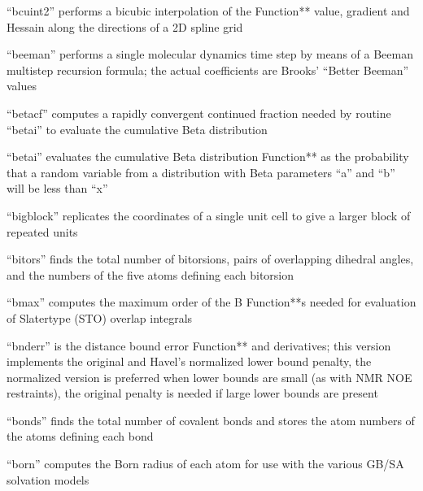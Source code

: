 \documentclass[letterpaper,11pt,english]{sphinxmanual}
\begin{document}
“bcuint2” performs a bicubic interpolation of the Function** value, gradient and Hessain along the directions of a 2D spline grid


“beeman” performs a single molecular dynamics time step by means of a Beeman multistep recursion formula; the actual coefficients are Brooks’ “Better Beeman” values


“betacf” computes a rapidly convergent continued fraction needed by routine “betai” to evaluate the cumulative Beta distribution


“betai” evaluates the cumulative Beta distribution Function** as the probability that a random variable from a distribution with Beta parameters “a” and “b” will be less than “x”


“bigblock” replicates the coordinates of a single unit cell to give a larger block of repeated units


“bitors” finds the total number of bitorsions, pairs of overlapping dihedral angles, and the numbers of the five atoms defining each bitorsion


“bmax” computes the maximum order of the B Function**s needed for evaluation of Slater\sphinxhyphen{}type (STO) overlap integrals


“bnderr” is the distance bound error Function** and derivatives; this version implements the original and Havel’s normalized lower bound penalty, the normalized version is preferred when lower bounds are small (as with NMR NOE restraints), the original penalty is needed if large lower bounds are present


“bonds” finds the total number of covalent bonds and stores the atom numbers of the atoms defining each bond


“born” computes the Born radius of each atom for use with the various GB/SA solvation models

\end{document}
